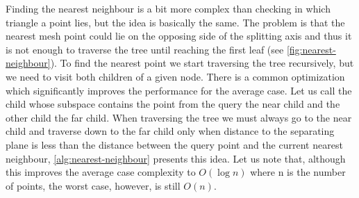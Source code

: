 Finding the nearest neighbour is a bit more complex than checking in which triangle a point lies, but the idea is basically the same. The problem is that the nearest mesh point could lie on the opposing side of the splitting axis and thus it is not enough to traverse the tree until reaching the first leaf (see \cref{fig:nearest-neighbour}). To find the nearest point we start traversing the tree recursively, but we need to visit both children of a given node. There is a common optimization which significantly improves the performance for the average case. Let us call the child whose subspace contains the point from the query the near child and the other child the far child. When traversing the tree we must always go to the near child and traverse down to the far child only when distance to the separating plane is less than the distance between the query point and the current nearest neighbour, \cref{alg:nearest-neighbour} presents this idea. Let us note that, although this improves the average case complexity to $O(\log{n})$ where n is the number of points, the worst case, however, is still $O(n)$.

